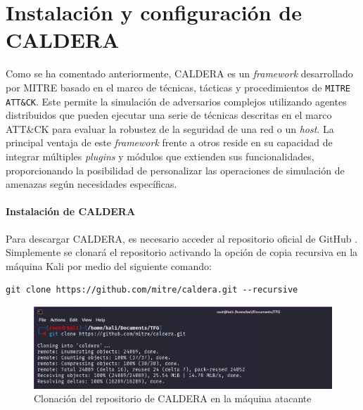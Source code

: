 \chapter{Instalación y configuración de \gls{CALDERA}} \label{caldera-conf}

\vspace{-2mm}

Como se ha comentado anteriormente, \gls{CALDERA} es un \textit{framework} desarrollado por MITRE basado en el marco de técnicas, tácticas y procedimientos de \texttt{MITRE \gls{ATT&CK}}. Este permite la simulación de adversarios complejos utilizando agentes distribuidos que pueden ejecutar una serie de técnicas descritas en el marco \gls{ATT&CK} para evaluar la robustez de la seguridad de una red o un \textit{host}. La principal ventaja de este \textit{framework} frente a otros reside en su capacidad de integrar múltiples \textit{plugins} y módulos que extienden sus funcionalidades, proporcionando la posibilidad de personalizar las operaciones de simulación de amenazas según necesidades específicas.


\subsubsection{Instalación de \gls{CALDERA}}

Para descargar \gls{CALDERA}, es necesario acceder al repositorio oficial de GitHub \cite{caldera}. Simplemente se clonará el repositorio activando la opción de copia recursiva en la máquina Kali por medio del siguiente comando:


\begin{center}
    \footnotesize
    \begin{mdframed}
            \begin{verbatim}
git clone https://github.com/mitre/caldera.git --recursive
        \end{verbatim}
    \end{mdframed}
\end{center}

\begin{figure}[H]
    \centering
    \includegraphics[width=1\linewidth]{imagenes/clone-caldera.png}
    \caption{Clonación del repositorio de CALDERA en la máquina atacante}
    \label{fig:git-caldera}
\end{figure}

